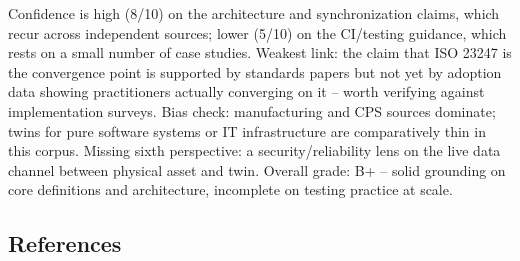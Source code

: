 \documentclass[
  12pt,
  a4paper,
]{article}
\begin{document}
Confidence is high (8/10) on the architecture and synchronization
claims, which recur across independent sources; lower (5/10) on the
CI/testing guidance, which rests on a small number of case studies.
Weakest link: the claim that ISO 23247 is the convergence point is
supported by standards papers but not yet by adoption data showing
practitioners actually converging on it -- worth verifying against
implementation surveys. Bias check: manufacturing and CPS sources
dominate; twins for pure software systems or IT infrastructure are
comparatively thin in this corpus. Missing sixth perspective: a
security/reliability lens on the live data channel between physical
asset and twin. Overall grade: B+ -- solid grounding on core definitions
and architecture, incomplete on testing practice at scale.

\subsection{References}\label{references}
\end{document}
